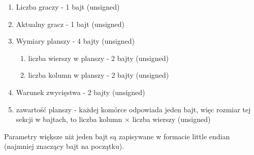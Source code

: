 \documentclass{article}
\begin{document}
\begin{enumerate}
\item Liczba graczy - 1 bajt (unsigned)
\item Aktualny gracz - 1 bajt (unsigned)
\item Wymiary planszy - 4 bajty (unsigned)
  \begin{enumerate}
    \item liczba wierszy w planszy - 2 bajty (unsigned)
    \item liczba kolumn w planszy - 2 bajty (unsigned)
  \end{enumerate}
\item Warunek zwycięstwa - 2 bajty (unsigned)
\item zawartość planszy - każdej komórce odpowiada jeden bajt, więc rozmiar tej sekcji w bajtach, to liczba kolumn 
$\times$ liczba wierszy (unsigned)
\end{enumerate}

Parametry większe niż jeden bajt są zapisywane w formacie little endian (najmniej znaczący bajt na początku).
\end{document}
